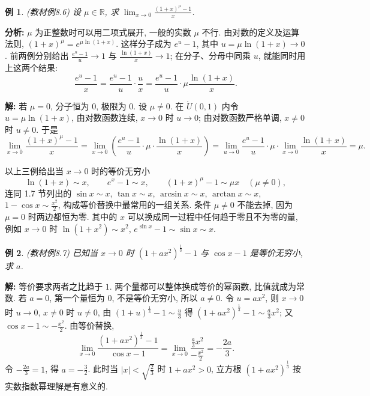 \documentclass[UTF8,openany]{ctexbook}
\theoremstyle{chinesetextbook}
\newtheorem{example}{例}[section]
\newenvironment{cnsolution}{\par\indent\textbf{解:} \ignorespaces}{\par}
\begin{document}
\begin{example}\label{ex:8-6}
\textnormal{(教材例8.6)} 设 $\mu\in\mathbb R$, 求 $\displaystyle\lim_{x\to0}\frac{(1+x)^\mu-1}x$.
\end{example}
\par\indent\textbf{分析:} $\mu$ 为正整数时可以用二项式展开, 一般的实数 $\mu$ 不行. 由对数的定义及运算法则, $(1+x)^\mu=e^{\mu\ln(1+x)}$. 这样分子成为 $e^u-1$, 其中 $u=\mu\ln(1+x)\to0$. 前两例分别给出 $\displaystyle\frac{e^u-1}u\to1$ 与 $\displaystyle\frac{\ln(1+x)}x\to1$; 在分子、分母中同乘 $u$, 就能同时用上这两个结果:
\[
\frac{e^u-1}x=\frac{e^u-1}u\cdot\frac ux=\frac{e^u-1}u\cdot\mu\frac{\ln(1+x)}x.
\]
\begin{cnsolution}
若 $\mu=0$, 分子恒为 $0$, 极限为 $0$. 设 $\mu\ne0$. 在 $\mathring U(0,1)$ 内令 $u=\mu\ln(1+x)$, 由对数函数连续, $x\to0$ 时 $u\to0$; 由对数函数严格单调, $x\ne0$ 时 $u\ne0$. 于是
\[
\lim_{x\to0}\frac{(1+x)^\mu-1}x=\lim_{x\to0}\left(\frac{e^u-1}u\cdot\mu\cdot\frac{\ln(1+x)}x\right)=\lim_{u\to0}\frac{e^u-1}u\cdot\mu\cdot\lim_{x\to0}\frac{\ln(1+x)}x=\mu.
\]
\end{cnsolution}
以上三例给出当 $x\to0$ 时的等价无穷小
\[
\ln(1+x)\sim x,\qquad e^x-1\sim x,\qquad(1+x)^\mu-1\sim\mu x\quad(\mu\ne0),
\]
连同 1.7 节列出的 $\sin x\sim x$, $\tan x\sim x$, $\arcsin x\sim x$, $\arctan x\sim x$, $\displaystyle1-\cos x\sim\frac{x^2}2$, 构成等价替换中最常用的一组关系. 条件 $\mu\ne0$ 不能去掉, 因为 $\mu=0$ 时两边都恒为零. 其中的 $x$ 可以换成同一过程中任何趋于零且不为零的量, 例如 $x\to0$ 时 $\ln(1+x^2)\sim x^2$, $e^{\sin x}-1\sim\sin x\sim x$.
\begin{example}
\textnormal{(教材例8.7)} 已知当 $x\to0$ 时 $(1+ax^2)^{\frac13}-1$ 与 $\cos x-1$ 是等价无穷小, 求 $a$.
\end{example}
\begin{cnsolution}
等价要求两者之比趋于 $1$. 两个量都可以整体换成等价的幂函数, 比值就成为常数. 若 $a=0$, 第一个量恒为 $0$, 不是等价无穷小, 所以 $a\ne0$. 令 $u=ax^2$, 则 $x\to0$ 时 $u\to0$, $x\ne0$ 时 $u\ne0$, 由 $\displaystyle(1+u)^{\frac13}-1\sim\frac u3$ 得 $\displaystyle(1+ax^2)^{\frac13}-1\sim\frac a3x^2$; 又 $\displaystyle\cos x-1\sim-\frac{x^2}2$. 由等价替换,
\[
\lim_{x\to0}\frac{(1+ax^2)^{\frac13}-1}{\cos x-1}=\lim_{x\to0}\frac{\frac a3x^2}{-\frac{x^2}2}=-\frac{2a}3.
\]
令 $\displaystyle-\frac{2a}3=1$, 得 $\displaystyle a=-\frac32$. 此时当 $\displaystyle|x|<\sqrt{\frac23}$ 时 $1+ax^2>0$, 立方根 $(1+ax^2)^{\frac13}$ 按实数指数幂理解是有意义的.
\end{cnsolution}
\end{document}
